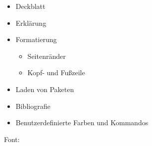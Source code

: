 \documentclass{scrartcl}
\begin{document}
    \begin{itemize}
        \item Deckblatt
        \item Erklärung
        \item Formatierung
        \begin{itemize}
            \item Seitenränder
            \item Kopf- und Fußzeile
        \end{itemize}
        \item Laden von Paketen
        \item Bibliografie
        \item Benutzerdefinierte Farben und Kommandos
    \end{itemize}

Font: \testfont
\end{document}
